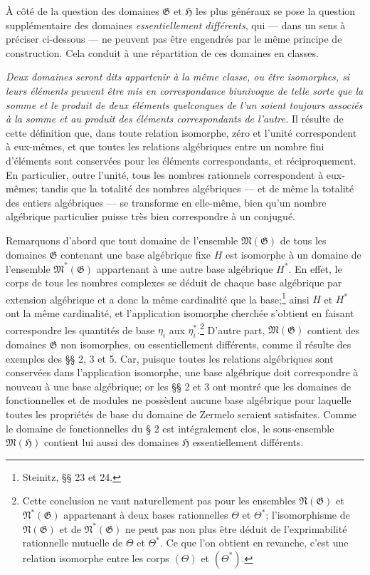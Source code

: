 À côté de la question des domaines $\mathfrak G$ et $\mathfrak H$ les plus généraux se pose la question supplémentaire des domaines \emph{essentiellement différents}, qui --- dans un sens à préciser ci-dessous --- ne peuvent pas être engendrés par le même principe de construction. Cela conduit à une répartition de ces domaines en classes.

\emph{Deux domaines seront dits appartenir à la même classe, ou être isomorphes, si leurs éléments peuvent être mis en correspondance biunivoque de telle sorte que la somme et le produit de deux éléments quelconques de l'un soient toujours associés à la somme et au produit des éléments correspondants de l'autre.} Il résulte de cette définition que, dans toute relation isomorphe, zéro et l'unité correspondent à eux-mêmes, et que toutes les relations algébriques entre un nombre fini d'éléments sont conservées pour les éléments correspondants, et réciproquement. En particulier, outre l'unité, tous les nombres rationnels correspondent à eux-mêmes; tandis que la totalité des nombres algébriques --- et de même la totalité des entiers algébriques --- se transforme en elle-même, bien qu'un nombre algébrique particulier puisse très bien correspondre à un conjugué.

Remarquons d'abord que tout domaine de l'ensemble $\mathfrak M(\mathfrak G)$ de tous les domaines $\mathfrak G$ contenant une base algébrique fixe $H$ est isomorphe à un domaine de l'ensemble $\mathfrak M^*(\mathfrak G)$ appartenant à une autre base algébrique $H^*$. En effet, le corps de tous les nombres complexes se déduit de chaque base algébrique par extension algébrique et a donc la même cardinalité que la base;\footnote{Steinitz, \S{}\S{} 23 et 24.} ainsi $H$ et $H^*$ ont la même cardinalité, et l'application isomorphe cherchée s'obtient en faisant correspondre les quantités de base $\eta_i$ aux $\eta_i^*$.\footnote{Cette conclusion ne vaut naturellement pas pour les ensembles $\mathfrak N(\mathfrak G)$ et $\mathfrak N^*(\mathfrak G)$ appartenant à deux bases rationnelles $\Theta$ et $\Theta^*$; l'isomorphisme de $\mathfrak N(\mathfrak G)$ et de $\mathfrak N^*(\mathfrak G)$ ne peut pas non plus être déduit de l'exprimabilité rationnelle mutuelle de $\Theta$ et $\Theta^*$. Ce que l'on obtient en revanche, c'est une relation isomorphe entre les corps $(\Theta)$ et $(\Theta^*)$.} D'autre part, $\mathfrak M(\mathfrak G)$ contient des domaines $\mathfrak G$ non isomorphes, ou essentiellement différents, comme il résulte des exemples des \S{}\S{} 2, 3 et 5. Car, puisque toutes les relations algébriques sont conservées dans l'application isomorphe, une base algébrique doit correspondre à nouveau à une base algébrique; or les \S{}\S{} 2 et 3 ont montré que les domaines de fonctionnelles et de modules ne possèdent aucune base algébrique pour laquelle toutes les propriétés de base du domaine de Zermelo seraient satisfaites. Comme le domaine de fonctionnelles du \S{} 2 est intégralement clos, le sous-ensemble $\mathfrak M(\mathfrak H)$ contient lui aussi des domaines $\mathfrak H$ essentiellement différents.

